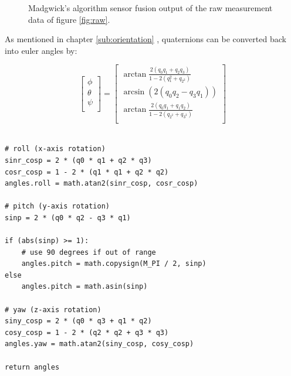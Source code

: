 
\begin{figure}[!h]
  \centering
  \resizebox{0.8\linewidth}{!}{}
  \caption{Madgwick's algorithm sensor fusion output of the raw measurement data of figure \ref{fig:raw}.}
  \label{fig:fusion_output}
\end{figure}


As mentioned in chapter \ref{sub:orientation} , quaternions can be converted back into euler angles by:

\begin{equation}
  \begin{bmatrix}
    \phi   \\
    \theta \\
    \psi   \\
  \end{bmatrix}
  =
  \begin{bmatrix}
    \arctan \frac{2(q_0q_1+q_2q_3)}{1-2(q{_1^2}+q_{2^2})} \\
    \arcsin (2(q_0q_2-q_3q_1))                            \\
    \arctan \frac{2(q_0q_1+q_1q_2)}{1-2(q_{2^2}+q_{3^2})} \\
  \end{bmatrix}
\end{equation}

\lstset{language=Python}
\begin{lstlisting}[frame=single]  % Start your code-block
    
# roll (x-axis rotation)
sinr_cosp = 2 * (q0 * q1 + q2 * q3)
cosr_cosp = 1 - 2 * (q1 * q1 + q2 * q2)
angles.roll = math.atan2(sinr_cosp, cosr_cosp)

# pitch (y-axis rotation)
sinp = 2 * (q0 * q2 - q3 * q1)

if (abs(sinp) >= 1):
    # use 90 degrees if out of range
    angles.pitch = math.copysign(M_PI / 2, sinp)
else
    angles.pitch = math.asin(sinp)

# yaw (z-axis rotation)
siny_cosp = 2 * (q0 * q3 + q1 * q2)
cosy_cosp = 1 - 2 * (q2 * q2 + q3 * q3)
angles.yaw = math.atan2(siny_cosp, cosy_cosp)

return angles
    
\end{lstlisting}

